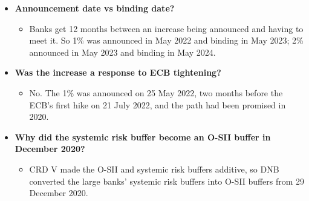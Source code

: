 \documentclass[10pt]{article}
\begin{document}
\begin{tcolorbox}[sbox,width=0.495\linewidth,height=14.6cm,nobeforeafter,box align=top,fit basedim=11pt,colframe=nlred!70,colbacktitle=nlred!8,coltitle=nlred,title=LIKELY CHALLENGES · definitions and logic]
\begin{itemize}
\item[\textcolor{navy}{\textbf{Q}}] \textbf{Announcement date vs binding date?}
\begin{itemize}
\item Banks get 12 months between an increase being announced and having to meet it. So 1\% was announced in May 2022 and binding in May 2023; 2\% announced in May 2023 and binding in May 2024.
\end{itemize}
\item[\textcolor{navy}{\textbf{Q}}] \textbf{Was the increase a response to ECB tightening?}
\begin{itemize}
\item No. The 1\% was announced on 25 May 2022, two months before the ECB's first hike on 21 July 2022, and the path had been promised in 2020.
\end{itemize}
\item[\textcolor{navy}{\textbf{Q}}] \textbf{Why did the systemic risk buffer become an O-SII buffer in December 2020?}
\begin{itemize}
\item CRD V made the O-SII and systemic risk buffers additive, so DNB converted the large banks' systemic risk buffers into O-SII buffers from 29 December 2020.
\end{itemize}
\end{itemize}
\end{tcolorbox}
\newpage
\end{document}
